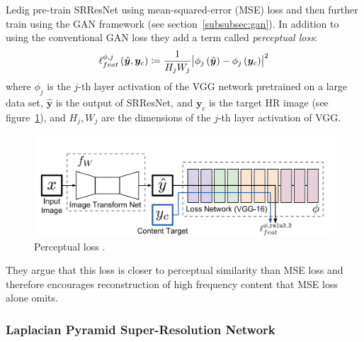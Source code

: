 Ledig \etal pre-train SRResNet using mean-squared-error (MSE) loss and then further train using the GAN framework (see section~\ref{subsubsec:gan}).
%
In addition to using the conventional GAN loss they add a term called \textit{perceptual loss}:
\begin{equation}
    \ell_{feat}^{\phi, j} \left( \hat{\bm{y}}, \bm{y}_c\right) \coloneqq \frac{1}{H_j W_j} \abs{\phi_j\left({\hat{\bm{y}}}\right) - \phi_j \left(\bm{y}_c\right)}^2
\end{equation}
where \(\phi_j\) is the \(j\)-th layer activation of the VGG network \cite{simonyan2014very} pretrained on a large data set, \(\hat{\bm{y}}\) is the output of SRResNet, and \(\bm{y}_c\) is the target HR image (see figure~\ref{fig:perceptualloss}), and \(H_j, W_j\) are the dimensions of the \(j\)-th layer activation of VGG.
\begin{figure}[!htbp]
    \centering
    \begin{adjustbox}{width=\linewidth}
        \centering
        \includegraphics[]{figures/neural_networks/perceptual_loss.png}
    \end{adjustbox}
    \caption{Perceptual loss \cite{johnson2016perceptual}.}\label{fig:perceptualloss}
\end{figure}
%
They argue that this loss is closer to perceptual similarity than MSE loss and therefore encourages reconstruction of high frequency content that MSE loss alone omits.




\subsubsection{Laplacian Pyramid Super-Resolution Network}\label{subsubsec:lapsrn}




